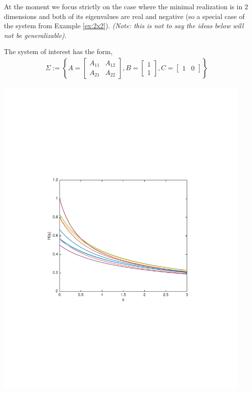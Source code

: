 \documentclass[11 pt]{article}
\newcommand{\jss}[1]{{\color{olive}\it #1}}
\begin{document}
  \begin{minipage}{0.5\textwidth}
  At the moment we focus strictly on the case where the minimal realization is in $2$ dimensions and both of its eigenvalues are real and negative (so a special case of the system from Example \ref{ex:2x2}). \jss{(Note: this is not to say the ideas below will not be generalizable).}

    The system of interest has the form,
  \begin{align*}
    \Sigma := \left\{ A = \begin{bmatrix} A_{11} & A_{12} \\ A_{21} & A_{22} \end{bmatrix}, B = \begin{bmatrix} 1 \\ 1 \end{bmatrix}, C = \begin{bmatrix} 1 & 0 \end{bmatrix} \right\}
  \end{align*}
  \end{minipage}%
  \begin{minipage}{0.5\textwidth}
    \centering
    \includegraphics[width=0.95\textwidth]{figure_2x2mutation01}%
      \label{fig:mut}%
  \end{minipage}
\end{document}
